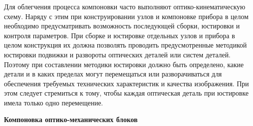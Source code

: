 Для облегчения процесса компоновки часто выполняют оптико-кинематическую схему. Наряду с этим при конструировании узлов и компоновке прибора в целом необходимо предусматривать возможность последующей сборки, юстировки и контроля параметров. При сборке и юстировке отдельных узлов и прибора в целом конструкция их должна позволять проводить предусмотренные методикой юстировки подвижки и развороты оптических деталей или систем деталей. Поэтому при составлении методики юстировки должно быть определено, какие детали и в каких пределах могут перемещаться или разворачиваться для обеспечения требуемых технических характеристик и качества изображения. При этом следует стремиться к тому, чтобы каждая оптическая деталь при юстировке имела только одно перемещение.

\begin{flushleft}
	\textbf{Компоновка оптико-механических блоков}
\end{flushleft}

